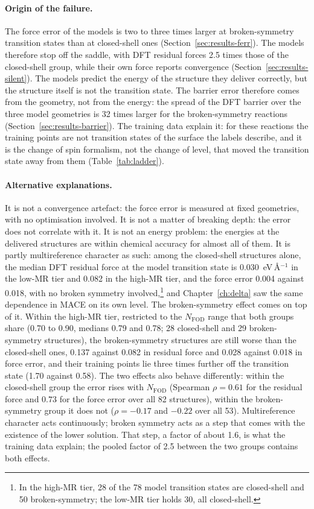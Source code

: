 \paragraph{Origin of the failure.} The force error of the models is
two to three times larger at broken-symmetry transition states than
at closed-shell ones (Section~\ref{sec:results-ferr}). The
models therefore stop off the saddle, with DFT residual forces 2.5
times those of the closed-shell group, while their own force reports
convergence (Section~\ref{sec:results-silent}). The models predict the energy of
the structure they deliver correctly, but the structure itself is not
the transition state. The barrier error therefore comes from the
geometry, not from the energy: the spread of the DFT barrier over the
three model geometries is 32 times larger for the broken-symmetry
reactions (Section~\ref{sec:results-barrier}). The training data explain it: for these reactions the training
points are not transition states of the surface the labels describe,
and it is the change of spin formalism, not the change of level, that
moved the transition state away from them (Table~\ref{tab:ladder}).

\paragraph{Alternative explanations.} It is not a convergence
artefact: the force error is measured at fixed geometries, with no
optimisation involved. It is not a matter of breaking depth: the
error does not correlate with it. It is not an energy problem: the
energies at the delivered structures are within chemical accuracy
for almost all of them. It is partly multireference character as
such: among the closed-shell structures alone, the median DFT
residual force at the model transition state is 0.030~eV\,\AA$^{-1}$ in
the low-MR tier and 0.082 in the high-MR tier, and the force error
0.004 against 0.018, with no broken symmetry involved,\footnote{In
the high-MR tier, 28 of the 78 model transition states are closed-shell
and 50 broken-symmetry; the low-MR tier holds 30, all closed-shell.}
and Chapter~\ref{ch:delta} saw the same dependence in MACE on its own
level. The broken-symmetry effect comes on top of it. Within the
high-MR tier, restricted to the $N_\mathrm{FOD}$ range that both groups
share (0.70 to 0.90, medians 0.79 and 0.78; 28 closed-shell and 29
broken-symmetry structures), the broken-symmetry structures are still
worse than the closed-shell ones, 0.137 against 0.082 in residual
force and 0.028 against 0.018 in force error, and their training
points lie three times further off the transition state (1.70 against
0.58). The two effects also behave differently: within the
closed-shell group the error rises with $N_\mathrm{FOD}$ (Spearman
$\rho = 0.61$ for the residual force and $0.73$ for the force error over
all 82 structures), within the broken-symmetry group it does not
($\rho = -0.17$ and $-0.22$ over all 53). Multireference character acts
continuously; broken symmetry acts as a step that comes with the
existence of the lower solution. That step, a factor of about 1.6, is
what the training data explain; the pooled factor of 2.5 between the
two groups contains both effects.

